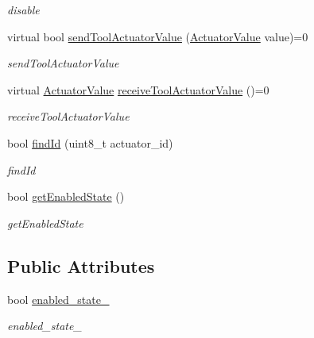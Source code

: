 \begin{DoxyCompactItemize}
\begin{DoxyCompactList}\small\item\em disable \end{DoxyCompactList}\item 
virtual bool \hyperlink{classrobotis__manipulator_1_1_tool_actuator_a5fdb394c44142a588cfefcbf22de11ec}{send\+Tool\+Actuator\+Value} (\hyperlink{namespacerobotis__manipulator_a26f478d98222f9ce1bf66c7df248037b}{Actuator\+Value} value)=0
\begin{DoxyCompactList}\small\item\em send\+Tool\+Actuator\+Value \end{DoxyCompactList}\item 
virtual \hyperlink{namespacerobotis__manipulator_a26f478d98222f9ce1bf66c7df248037b}{Actuator\+Value} \hyperlink{classrobotis__manipulator_1_1_tool_actuator_a5b3d663619610cf739b16efb1b3a580f}{receive\+Tool\+Actuator\+Value} ()=0
\begin{DoxyCompactList}\small\item\em receive\+Tool\+Actuator\+Value \end{DoxyCompactList}\item 
bool \hyperlink{classrobotis__manipulator_1_1_tool_actuator_a6b64dd76b7d473f3a634762422e5951f}{find\+Id} (uint8\+\_\+t actuator\+\_\+id)
\begin{DoxyCompactList}\small\item\em find\+Id \end{DoxyCompactList}\item 
bool \hyperlink{classrobotis__manipulator_1_1_tool_actuator_a2a8dc83e93e4c0b965423a2058c9c590}{get\+Enabled\+State} ()
\begin{DoxyCompactList}\small\item\em get\+Enabled\+State \end{DoxyCompactList}\end{DoxyCompactItemize}
\subsection*{Public Attributes}
\begin{DoxyCompactItemize}
\item 
bool \hyperlink{classrobotis__manipulator_1_1_tool_actuator_ae9bdfbba232f772298d8c3342c125b4a}{enabled\+\_\+state\+\_\+}
\begin{DoxyCompactList}\small\item\em enabled\+\_\+state\+\_\+ \end{DoxyCompactList}\end{DoxyCompactItemize}


